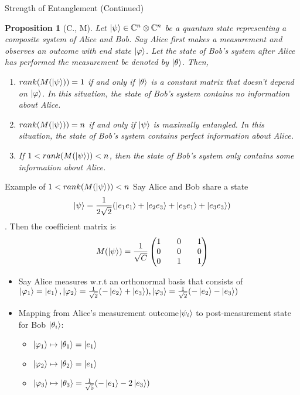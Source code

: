 \documentclass[handout, 10 pt]{beamer}
\newtheorem{prop}{Proposition}
\begin{document}
\begin{frame}{Strength of Entanglement (Continued)}
\begin{prop} [C., M]
\label{entanglement-rank}
Let $\ket{\psi} \in \mathbb{C}^n \otimes \mathbb{C}^{n}$ be a quantum state representing a composite system of Alice and Bob. Say Alice first makes a measurement and observes an outcome with end state $\ket{\varphi}$. Let the state of Bob's system after Alice has performed the measurement be denoted by $\ket{\theta}$. Then,
\pause
\begin{enumerate}
    \item $rank(M(\ket{\psi}))=1$ if and only if $\ket{\theta}$ is a constant matrix that doesn't depend on $\ket{\varphi}$. In this situation, the state of Bob's system contains no information about Alice.
    \pause
    \item $rank(M(\ket{\psi}))=n$ if and only if $\ket{\psi}$ is maximally entangled. In this situation, the state of Bob's system contains perfect information about Alice.
    \pause
    \item If $1<rank(M(\ket{\psi}))<n$, then the state of Bob's system only contains some information about Alice.
\end{enumerate}
\end{prop}
\end{frame}

\begin{frame}{Example of $1<rank(M(\ket{\psi}))<n$}
Say Alice and Bob share a state $$\ket{\psi}=\frac{1}{2\sqrt{2}}(\ket{e_1 e_1}+\ket{e_2 e_3}+\ket{e_3 e_1}+\ket{e_3 e_3})$$. Then the coefficient matrix is $$M(\ket{\psi})=
\frac{1}{\sqrt{C}}\begin{pmatrix}
1 && 0 && 1\\
0 && 0 && 0\\
0 && 1 && 1\\
\end{pmatrix}$$ 

\pause
\begin{itemize}
    \item Say Alice measures w.r.t an orthonormal basis that consists of $\ket{\varphi_1}=\ket{e_1}, \ket{\varphi_2}=\frac{1}{\sqrt{2}}(-\ket{e_2}+\ket{e_3}), \ket{\varphi_3}=\frac{1}{\sqrt{2}}(-\ket{e_2}-\ket{e_3}) $
    \pause
    \item Mapping from Alice's measurement outcome$\ket{\psi_i}$ to post-measurement state for Bob $\ket{\theta_i}$:
    \begin{itemize}
        \item $\ket{\varphi_1} \mapsto \ket{\theta_1}=\ket{e_1}$
        \item $\ket{\varphi_2} \mapsto \ket{\theta_2}=\ket{e_1}$
        \item $\ket{\varphi_3} \mapsto \ket{\theta_3}=\frac{1}{\sqrt{5}}(-\ket{e_1}-2\ket{e_3})$
    \end{itemize}
\end{itemize}
\end{frame}
\end{document}
